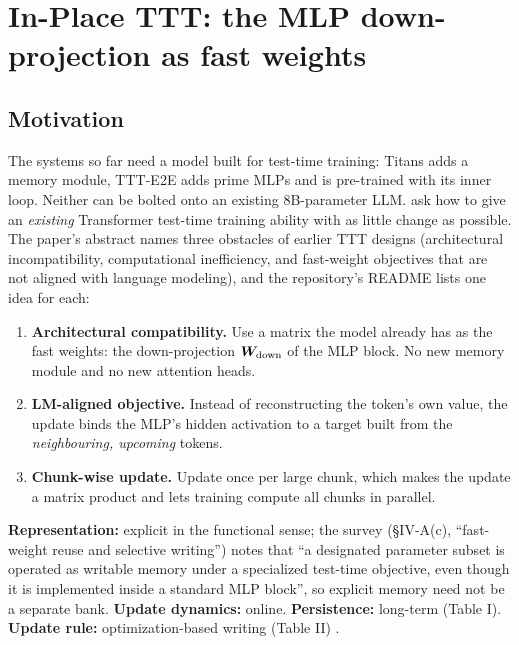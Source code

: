\section{In-Place TTT: the MLP down-projection as fast weights}\label{sec:c09-inplace}

\subsection{Motivation}

The systems so far need a model built for test-time training: Titans adds a memory module,
TTT-E2E adds prime MLPs and is pre-trained with its inner loop. Neither can be bolted onto an
existing 8B-parameter LLM. \citet{feng2026inplacettt} ask how to give an \emph{existing}
Transformer test-time training ability with as little change as possible. The paper's abstract
names three obstacles of earlier TTT designs (architectural incompatibility, computational
inefficiency, and fast-weight objectives that are not aligned with language modeling), and the
repository's README lists one idea for each:
\begin{enumerate}
  \item \textbf{Architectural compatibility.} Use a matrix the model already has as the fast
        weights: the down-projection $\bm{W}_{\text{down}}$ of the MLP block. No new memory module
        and no new attention heads.
  \item \textbf{LM-aligned objective.} Instead of reconstructing the token's own value, the
        update binds the MLP's hidden activation to a target built from the
        \emph{neighbouring, upcoming} tokens.
  \item \textbf{Chunk-wise update.} Update once per large chunk, which makes the update a
        matrix product and lets training compute all chunks in parallel.
\end{enumerate}

\begin{taxonomy}
\textbf{Representation:} explicit in the functional sense; the survey (\S IV-A(c),
``fast-weight reuse and selective writing'') notes that ``a designated parameter subset is
operated as writable memory under a specialized test-time objective, even though it is
implemented inside a standard MLP block'', so explicit memory need not be a separate bank.
\textbf{Update dynamics:} online. \textbf{Persistence:} long-term (Table I).
\textbf{Update rule:} optimization-based writing (Table II) \citep{zhoubian2026memory}.
\end{taxonomy}

